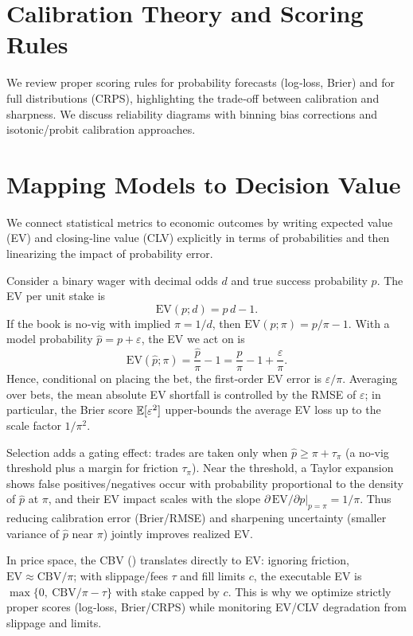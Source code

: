 \section{Calibration Theory and Scoring Rules}
We review proper scoring rules for probability forecasts (log‑loss, Brier) and for full distributions (CRPS), highlighting the trade‑off between calibration and sharpness. We discuss reliability diagrams with binning bias corrections and isotonic/probit calibration approaches.

\section{Mapping Models to Decision Value}
We connect statistical metrics to economic outcomes by writing expected value (EV) and closing‑line value (CLV) explicitly in terms of probabilities and then linearizing the impact of probability error.

Consider a binary wager with decimal odds $d$ and true success probability $p$. The EV per unit stake is
\[\mathrm{EV}(p;d)=p\,d-1.\]
If the book is no‑vig with implied $\pi=1/d$, then $\mathrm{EV}(p;\pi)=p/\pi-1$. With a model probability $\hat p=p+\varepsilon$, the EV we act on is
\[\mathrm{EV}(\hat p;\pi)=\frac{\hat p}{\pi}-1=\frac{p}{\pi}-1+\frac{\varepsilon}{\pi}.\]
Hence, conditional on placing the bet, the first‑order EV error is $\varepsilon/\pi$. Averaging over bets, the mean absolute EV shortfall is controlled by the RMSE of $\varepsilon$; in particular, the Brier score $\mathbb{E}[\varepsilon^2]$ upper‑bounds the average EV loss up to the scale factor $1/\pi^2$.

Selection adds a gating effect: trades are taken only when $\hat p\ge \pi+\tau_\pi$ (a no‑vig threshold plus a margin for friction $\tau_\pi$). Near the threshold, a Taylor expansion shows false positives/negatives occur with probability proportional to the density of $\hat p$ at $\pi$, and their EV impact scales with the slope $\partial\,\mathrm{EV}/\partial p\big|_{p=\pi}=1/\pi$. Thus reducing calibration error (Brier/RMSE) and sharpening uncertainty (smaller variance of $\hat p$ near $\pi$) jointly improves realized EV.

In price space, the CBV () translates directly to EV: ignoring friction, $\mathrm{EV}\approx \mathrm{CBV}/\pi$; with slippage/fees $\tau$ and fill limits $c$, the executable EV is $\max\{0,\ \mathrm{CBV}/\pi-\tau\}$ with stake capped by $c$. This is why we optimize strictly proper scores (log‑loss, Brier/CRPS) while monitoring EV/CLV degradation from slippage and limits.

